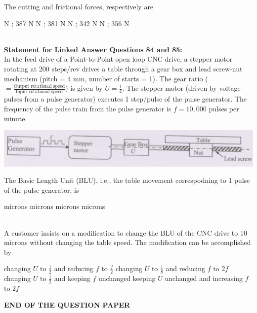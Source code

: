 \documentclass[addpoints,11pt]{exam}
\begin{document}
\begin{questions}
    \question The cutting and frictional forces, respectively are\\

    \begin{oneparchoices}
         N ; 387 N
         N ; 381 N
         N ; 342 N
         N ; 356 N
    \end{oneparchoices}\\

\normalsize\textbf{Statement for Linked Answer Questions 84 and 85:}\\
In the feed drive of a Point-to-Point open loop CNC drive, a stepper motor rotating at 200 steps/rev drives a table through a gear box and lead screw-nut mechanism (pitch = 4 mm, number of starts = 1). The gear ratio ($=\frac{\text{Output rotational speed}}{\text{Input rotational speed}}$) is given by $U=\frac{1}{4}$. The stepper motor (driven by voltage pulses from a pulse generator) executes 1 step/pulse of the pulse generator. The frequency of the pulse train from the pulse generator is $f=10,000$ pulses per minute.

\begin{center}
    \includegraphics[scale=0.3]{q84.png}
\end{center}
    \question The Basic Length Unit (BLU), i.e., the table movement correspodning to 1 pulse of the pulse generator, is\\

    \begin{oneparchoices}
         microns
         microns
         microns
         microns
    \end{oneparchoices}\\

    \question A customer insists on a modification to change the BLU of the CNC drive to 10 microns without changing the table speed. The modification can be accomplished by\\

    \begin{choices}
        \choice changing $U$ to $\frac{1}{2}$ and reducing $f$ to $\frac{f}{2}$
        \choice changing $U$ to $\frac{1}{8}$ and reducing $f$ to $2f$
        \choice changing $U$ to $\frac{1}{2}$ and keeping $f$ unchanged
        \choice keeping $U$ unchanged and increasing $f$ to $2f$
    \end{choices}

\vspace{1cm}
\centering\Large\textbf{END OF THE QUESTION PAPER}
\end{questions}
\end{document}
